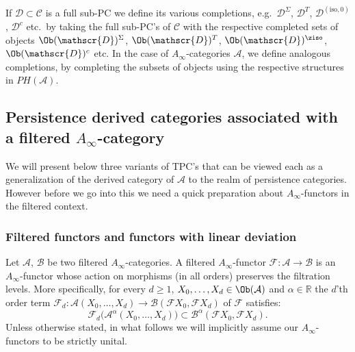 If $\mathscr{D} \subset \mathscr{C}$ is a full sub-PC we define its
various completions, e.g.~$\mathscr{D}^{\Sigma}$, $\mathscr{D}^{T}$,
$\mathscr{D}^{(\text{iso}, 0)}$, $\mathscr{D}^{c}$ etc.~by taking the
full sub-PC's of $\mathscr{C}$ with the respective completed sets of
objects $\Ob(\mathscr{D})^{\Sigma}$, $\Ob(\mathscr{D})^{T}$,
$\Ob(\mathscr{D})^{\ziso}$, $\Ob(\mathscr{D})^{c}$ etc. In the case of
$A_{\infty}$-categories $\mathcal{A}$, we define analogous
completions, by completing the subsets of objects using the respective
structures in $PH(\mathcal{A})$.

%

\subsection{Persistence derived categories associated with a filtered
  $A_{\infty}$-category} \label{sb:pdc} We will present below three
variants of TPC's that can be viewed each as a generalization of the
derived category of $\mathcal{A}$ to the realm of persistence
categories. However before we go into this we need a quick preparation
about $A_{\infty}$-functors in the filtered context.

\subsubsection{Filtered functors and functors with linear
  deviation} \label{sbsb:fil-func}

Let $\mathcal{A}$, $\mathcal{B}$ be two filtered
  $A_{\infty}$-categories. A filtered $A_{\infty}$-functor
  $\mathcal{F}: \mathcal{A} \longrightarrow \mathcal{B}$ is an
  $A_{\infty}$-functor whose action on morphisms (in all orders)
  preserves the filtration levels. More specifically, for every
  $d \geq 1$, $X_0, \ldots, X_d \in \Ob(\mathcal{A})$ and
  $\alpha \in \mathbb{R}$ the $d$'th order term
  $\mathcal{F}_d: \mathcal{A}(X_0, \ldots, X_d) \longrightarrow
  \mathcal{B}(\mathcal{F}X_0, \mathcal{F}X_d)$ of $\mathcal{F}$
  satisfies:
  $$\mathcal{F}_d \bigl(\mathcal{A}^{\alpha}(X_0, \ldots, X_d)\bigr) \subset
  \mathcal{B}^{\alpha}(\mathcal{F}X_0, \mathcal{F}X_d).$$ Unless
  otherwise stated, in what follows we will implicitly assume our
  $A_{\infty}$-functors to be strictly unital.

